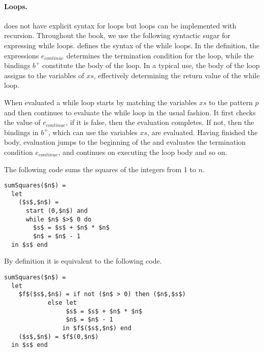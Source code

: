 \paragraph{Loops.}
%
\pml{} does not have explicit syntax for loops but loops can be
implemented with recursion.
%
Throughout the book, we use the following syntactic sugar for
expressing while loops.  
%
 defines the syntax of the while loops.
%
In the definition, the expressions $e_{continue}$ determines the
termination condition for the loop, while the bindings $b^+$
constitute the body of the loop.
%
In a typical use, the body of the loop assigns to the variables of
$xs$, effectively determining the return value of the while loop.

When evaluated a while loop starts by matching the variables $xs$ to
the pattern $p$ and then continues to evaluate the while loop in the
usual fashion.
%
It first checks the value of $e_{continue}$, if it is false, then the
evaluation completes.  
%
If not, then the  bindings in $b^{+}$, which can use the variables
$xs$, are evaluated.
%
Having finished the body, evaluation jumps to the beginning of the
 and evaluates the termination condition $e_{continue}$, and
continues on executing the loop body and so on. 

\begin{example}
The following code sums the squares of the integers from 1 to $n$.
%
\begin{lstlisting}[numbers=none]
sumSquares($n$) = 
  let
    ($s$,$n$) = 
      start (0,$n$) and 
      while $n$ $>$ 0 do
        $s$ = $s$ + $n$ * $n$
        $n$ = $n$ - 1
  in $s$ end
\end{lstlisting}
%
By definition it is equivalent
to the following code.
\begin{lstlisting}[numbers=none]
sumSquares($n$) = 
  let
    $f$($s$,$n$) = if not ($n$ > 0) then ($n$,$s$)
            else let
                 $s$ = $s$ + $n$ * $n$
                 $n$ = $n$ - 1
                in $f$($s$,$n$) end
    ($s$,$n$) = $f$(0,$n$)
  in $s$ end
\end{lstlisting}
\end{example}


